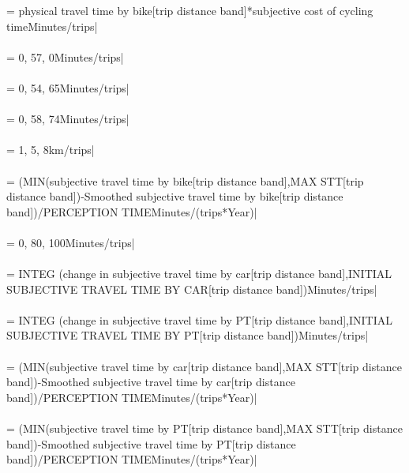  = physical travel time by bike[trip distance band]*subjective cost of cycling timeMinutes/trips| \\ \\ 
 = 0, 57, 0Minutes/trips| \\ \\ 
 = 0, 54, 65Minutes/trips| \\ \\ 
 = 0, 58, 74Minutes/trips| \\ \\ 
 = 1, 5, 8km/trips| \\ \\ 
 = (MIN(subjective travel time by bike[trip distance band],MAX STT[trip distance band])-Smoothed subjective travel time by bike[trip distance band])/PERCEPTION TIMEMinutes/(trips*Year)| \\ \\ 
 = 0, 80, 100Minutes/trips| \\ \\ 
 =  INTEG (change in subjective travel time by car[trip distance band],INITIAL SUBJECTIVE TRAVEL TIME BY CAR[trip distance band])Minutes/trips| \\ \\ 
 =  INTEG (change in subjective travel time by PT[trip distance band],INITIAL SUBJECTIVE TRAVEL TIME BY PT[trip distance band])Minutes/trips| \\ \\ 
 = (MIN(subjective travel time by car[trip distance band],MAX STT[trip distance band])-Smoothed subjective travel time by car[trip distance band])/PERCEPTION TIMEMinutes/(trips*Year)| \\ \\ 
 = (MIN(subjective travel time by PT[trip distance band],MAX STT[trip distance band])-Smoothed subjective travel time by PT[trip distance band])/PERCEPTION TIMEMinutes/(trips*Year)| \\ \\ 
